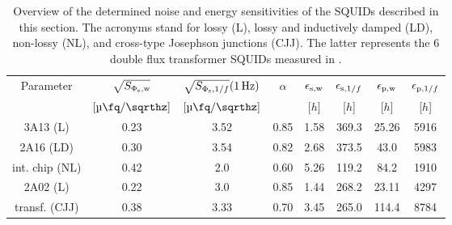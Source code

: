 \begin{table}[t!]
	\centering
	\begin{tabular}{c|*{7}{c}}
	\toprule
		Parameter & $\sqrt{S_{\rm \Phi_{\rm s},w}}$ & $\sqrt{S_{\Phi_{\rm s},1/f}}(\qty{1}{\Hz})$ & $\alpha$ & $\epsilon_{\rm s,w}$ & $\epsilon_{{\rm s},1/f}$ & $\epsilon_{\rm p,w}$ & $\epsilon_{{\rm p},1/f}$ \\
		 & $[\unit[per-mode=symbol]{\micro\fq\per\sqrthz}]$ & $[\unit[per-mode=symbol]{\micro\fq\per\sqrthz}]$ &  & [$h$] & [$h$] & [$h$] & [$h$] \\
		\midrule
		3A13 (L) & 0.23 & 3.52 & 0.85 & 1.58 & 369.3 & 25.26 & 5916 \\
		2A16 (LD) & 0.30 & 3.54 & 0.82 & 2.68 & 373.5 & 43.0 & 5983 \\
		int. chip (NL) & 0.42 & 2.0 & 0.60 & 5.26 & 119.2 & 84.2 & 1910 \\
		2A02 (L) & 0.22 & 3.0 & 0.85 & 1.44 & 268.2 & 23.11 & 4297 \\
		transf. (CJJ) & 0.38 & 3.33 & 0.70 & 3.45 & 265.0 & 114.4 & 8784 \\
	\end{tabular}
	\caption{Overview of the determined noise and energy sensitivities of the SQUIDs described in this section. The acronyms stand for lossy (L), lossy and inductively damped (LD), non-lossy (NL), and cross-type Josephson junctions (CJJ). The latter represents the \qty{6}{\nH} double flux transformer SQUIDs measured in \cite{Bauer2022}.}
	\label{tab:noise}
\end{table}










